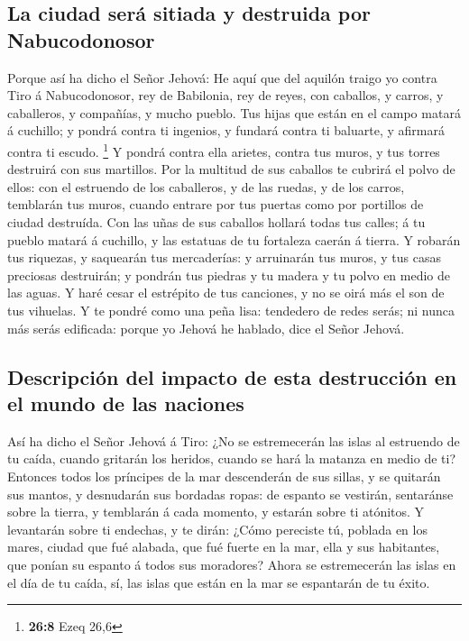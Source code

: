 \hypertarget{la-ciudad-seruxe1-sitiada-y-destruida-por-nabucodonosor}{%
\subsection{La ciudad será sitiada y destruida por
Nabucodonosor}\label{la-ciudad-seruxe1-sitiada-y-destruida-por-nabucodonosor}}

 Porque así ha dicho el Señor Jehová: He aquí que del
aquilón traigo yo contra Tiro á Nabucodonosor, rey de Babilonia, rey de
reyes, con caballos, y carros, y caballeros, y compañías, y mucho
pueblo.  Tus hijas que están en el campo matará á cuchillo;
y pondrá contra ti ingenios, y fundará contra ti baluarte, y afirmará
contra ti escudo. \footnote{\textbf{26:8} Ezeq 26,6}  Y
pondrá contra ella arietes, contra tus muros, y tus torres destruirá con
sus martillos.  Por la multitud de sus caballos te cubrirá
el polvo de ellos: con el estruendo de los caballeros, y de las ruedas,
y de los carros, temblarán tus muros, cuando entrare por tus puertas
como por portillos de ciudad destruída.  Con las uñas de
sus caballos hollará todas tus calles; á tu pueblo matará á cuchillo, y
las estatuas de tu fortaleza caerán á tierra.  Y robarán
tus riquezas, y saquearán tus mercaderías: y arruinarán tus muros, y tus
casas preciosas destruirán; y pondrán tus piedras y tu madera y tu polvo
en medio de las aguas.  Y haré cesar el estrépito de tus
canciones, y no se oirá más el son de tus vihuelas.  Y te
pondré como una peña lisa: tendedero de redes serás; ni nunca más serás
edificada: porque yo Jehová he hablado, dice el Señor Jehová.

\hypertarget{descripciuxf3n-del-impacto-de-esta-destrucciuxf3n-en-el-mundo-de-las-naciones}{%
\subsection{Descripción del impacto de esta destrucción en el mundo de
las
naciones}\label{descripciuxf3n-del-impacto-de-esta-destrucciuxf3n-en-el-mundo-de-las-naciones}}

 Así ha dicho el Señor Jehová á Tiro: ¿No se estremecerán
las islas al estruendo de tu caída, cuando gritarán los heridos, cuando
se hará la matanza en medio de ti?  Entonces todos los
príncipes de la mar descenderán de sus sillas, y se quitarán sus mantos,
y desnudarán sus bordadas ropas: de espanto se vestirán, sentaránse
sobre la tierra, y temblarán á cada momento, y estarán sobre ti
atónitos.  Y levantarán sobre ti endechas, y te dirán:
¿Cómo pereciste tú, poblada en los mares, ciudad que fué alabada, que
fué fuerte en la mar, ella y sus habitantes, que ponían su espanto á
todos sus moradores?  Ahora se estremecerán las islas en el
día de tu caída, sí, las islas que están en la mar se espantarán de tu
éxito.

